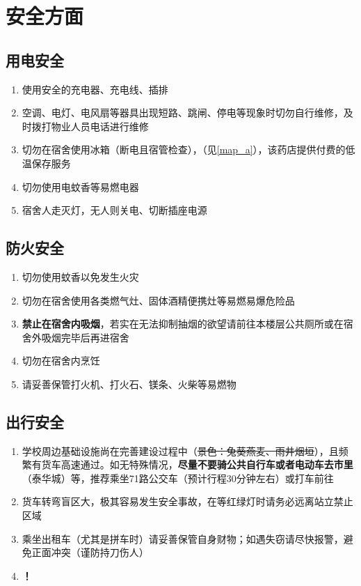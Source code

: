 \chapter[安全方面]{安全方面}
\section[用电安全]{用电安全}
\begin{enumerate}
    \item 使用安全的充电器、充电线、插排
    \item 空调、电灯、电风扇等器具出现短路、跳闸、停电等现象时切勿自行维修，及时拨打物业人员电话进行维修
    \item 切勿在宿舍使用冰箱（断电且宿管检查），\textbf{}（见\uline{\ref{map_a}}），该药店提供付费的低温保存服务
    \item 切勿使用电蚊香等易燃电器
    \item 宿舍人走灭灯，无人则关电、切断插座电源
\end{enumerate}

\section[防火安全]{防火安全}
\begin{enumerate}
    \item 切勿使用蚊香以免发生火灾
    \item 切勿在宿舍使用各类燃气灶、固体酒精便携灶等易燃易爆危险品
    \item \textbf{禁止在宿舍内吸烟}，若实在无法抑制抽烟的欲望请前往本楼层公共厕所或在宿舍外吸烟完毕后再进宿舍
    \item 切勿在宿舍内烹饪
    \item 请妥善保管打火机、打火石、镁条、火柴等易燃物
\end{enumerate}

\section[出行安全]{出行安全}
\begin{enumerate}
    \item 学校周边基础设施尚在完善建设过程中（\sout{景色：兔葵燕麦、雨井烟垣}），且频繁有货车高速通过。如无特殊情况，\textbf{尽量不要骑公共自行车或者电动车去市里}（泰华城）等，推荐乘坐71路公交车（预计行程30分钟左右）或打车前往
    \item 货车转弯盲区大，极其容易发生安全事故，在等红绿灯时请务必远离站立禁止区域
    \item 乘坐出租车（尤其是拼车时）请妥善保管自身财物；如遇失窃请尽快报警，避免正面冲突（谨防持刀伤人）
    \item \textbf{！}
\end{enumerate}

